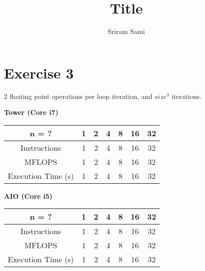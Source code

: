 \documentclass[12pt,a4paper]{article}
\author{Sriram Sami}
\title{Title}
\begin{document}
\maketitle
\tableofcontents

\newpage

\section{Exercise 3}

2 floating point operations per loop iteration, and $size^3$ iterations.

\begin{center}

\textbf{Tower (Core i7)} \\

\begin{tabular}{|c|c|c|c|c|c|c|}
\hline
n = ? & 1 & 2 & 4 & 8 & 16 & 32  \\
\hline
Instructions & 1 & 2 & 4 & 8 & 16 & 32  \\
\hline
MFLOPS & 1 & 2 & 4 & 8 & 16 & 32 \\
\hline
Execution Time (s) & 1 & 2 & 4 & 8 & 16 & 32 \\
\hline

\end{tabular}

\vspace{15pt}
 
\textbf{AIO (Core i5)} \\

\begin{tabular}{|c|c|c|c|c|c|c|}
\hline
n = ? & 1 & 2 & 4 & 8 & 16 & 32  \\
\hline
Instructions & 1 & 2 & 4 & 8 & 16 & 32  \\
\hline
MFLOPS & 1 & 2 & 4 & 8 & 16 & 32 \\
\hline
Execution Time (s) & 1 & 2 & 4 & 8 & 16 & 32 \\
\hline

\end{tabular}

\end{center}
\end{document}
